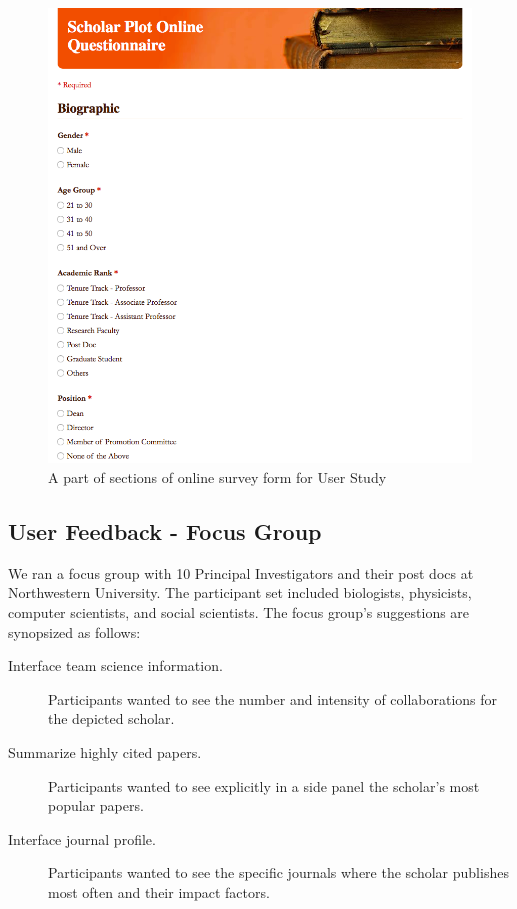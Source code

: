  \begin{figure}
  \centering
  \includegraphics[width=\columnwidth]{figures/fig_survey_form}
  \caption{A part of sections of online survey form for User Study}
  \label{fig:SurveyForm} 
\end{figure}

\subsection{User Feedback - Focus Group}
We ran a focus group with 10  Principal Investigators and their post docs at Northwestern University. The participant set included biologists, physicists, computer scientists, and social scientists.  The focus group's suggestions are synopsized as follows:
\begin{description}
\item [Interface team science information.] Participants wanted to see the number and intensity of collaborations for the depicted scholar.
\item [Summarize highly cited papers.] Participants wanted to see explicitly in a side panel the scholar's most popular papers.
\item [Interface journal profile.] Participants wanted to see the specific journals where the scholar publishes most often and their impact factors.
\end{description}

